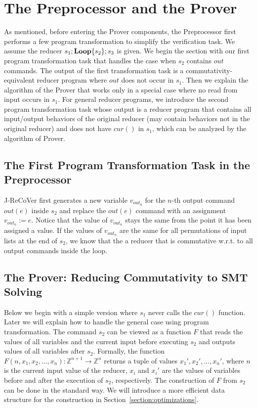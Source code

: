 \documentclass{llncs}
\newcommand{\cur}{cur()}
\newcommand{\rloop}{
	\ifmmode 
	\mathbf{Loop}
	\else
	\textbf{Loop}
	\fi}
\newcommand{\Z}{\mathbb{Z}}
\begin{document}
\section{The Preprocessor and the Prover}
\label{sec:preprocessor_prover}

As mentioned, before entering the Prover components, the Preprocessor first performs a few program transformation to simplify the verification task. 
We assume the reducer $s_1;\rloop\{s_2\};s_3$ is given. We begin the section with our first program transformation task that handles the case when $s_2$ contains $out$ commands. The output of the first transformation task is a commutativity-equivalent reducer program where $out$ does not occur in $s_1$. Then we explain the algorithm of the Prover that works only in a special case where no read from input occurs in $s_1$. For general reducer programs, we introduce the second program transformation task whose output is a reducer program that contains all input/output behaviors of the original reducer (may contain behaviors not in the original reducer) and does not have $\cur$ in $s_1$, which can be analyzed by the algorithm of Prover.  

\subsection{The First Program Transformation Task in the Preprocessor}
\label{sec:program_trans1}
J-ReCoVer  first generates a new variable $v_{out_n}$ for the $n$-th output command $out(e)$ inside $s_2$ and replace the $out(e)$ command with an assignment $v_{out_n}:=e$. 
Notice that the value of $v_{out_n}$ stays the same from the point it has been assigned a value. 
If the values of $v_{out_n}$ are the same for all permutations of input lists at the end of $s_2$, we know that the a reducer that is commutative w.r.t. to all output commands inside the loop.

\subsection{The Prover: Reducing Commutativity to SMT Solving}
\label{sec:prover}
Below we begin with a simple version where $s_1$ never calls the $\cur$ function. Later we will explain how to handle the general case using program transformation. The command $s_2$ can be viewed as a function $F$ that reads the values of all variables and the current input before executing $s_2$ and outputs values of all variables after $s_2$. Formally, the function $F(n,x_1,x_2,\ldots,x_n): \Z^{n+1} \rightarrow \Z^n$ returns a tuple of values $x_1',x_2',\ldots,x_n'$, where $n$ is the current input value of the reducer, $x_i$ and $x_i'$ are the values of variables before and after the execution of $s_2$, respectively. The construction of $F$ from $s_2$ can be done in the standard way. We will introduce a more efficient data structure for the construction in Section~\ref{section:optimizations}.
\end{document}

